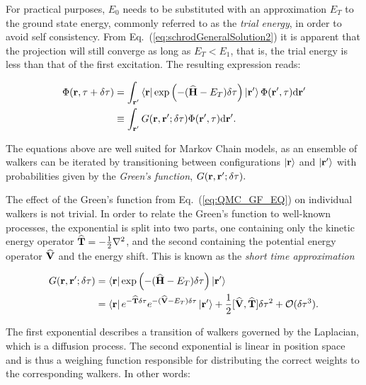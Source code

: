 For practical purposes, $E_0$ needs to be substituted with an approximation $E_T$ to the ground state energy, commonly referred to as the \textit{trial energy}, in order to avoid self consistency. From Eq.~(\ref{eq:schrodGeneralSolution2}) it is apparent that the projection will still converge as long as $E_T < E_1$, that is, the trial energy is less than that of the first excitation. The resulting expression reads:

\begin{align}
 \Phi(\mathbf{r}, \tau + \delta\tau) &= \int_{\mathbf{r}'}\left< \mathbf{r} \right|\exp\left(-({\bf\widehat{H}} - E_T)\delta\tau\right)\left| \mathbf{r}' \right>\Phi(\mathbf{r}', \tau)\mathrm{d}\mathbf{r}' \\
  &\equiv \int_{\mathbf{r}'}G(\mathbf{r}, \mathbf{r'}; \delta\tau)\Phi(\mathbf{r}', \tau)\mathrm{d}\mathbf{r}'.  \label{eq:QMC_GF_EQ}
\end{align}

The equations above are well suited for Markov Chain models, as an ensemble of walkers can be iterated by transitioning between configurations $\left| \mathbf{r} \right>$ and $\left| \mathbf{r}' \right>$ with probabilities given by the \textit{Green's function}, $G(\mathbf{r}, \mathbf{r'}; \delta\tau).$

The effect of the Green's function from Eq.~(\ref{eq:QMC_GF_EQ}) on individual walkers is not trivial. In order to relate the Green's function to well-known processes, the exponential is split into two parts, one containing only the kinetic energy operator ${\bf\widehat{T}} = -\frac{1}{2}\nabla^2$, and the second containing the potential energy operator ${\bf\widehat{V}}$ and the energy shift. This is known as the \textit{short time approximation}\cite{abInitioMC}

\begin{align}
  G(\mathbf{r}, \mathbf{r'}; \delta\tau) &= \left< \mathbf{r} \right|\exp\left(-({\bf\widehat{H}} - E_T)\delta\tau\right)\left| \mathbf{r}' \right> \label{eq:firstTrialEnergyIntro} \\
  &= \left< \mathbf{r} \right|e^{-{\bf\widehat{T}}\delta\tau}e^{-({\bf\widehat{V}} - E_T)\delta\tau}\left| \mathbf{r}' \right> + \frac{1}{2}[{\bf\widehat{V}}, {\bf\widehat{T}}]\delta\tau^2 + \mathcal{O}(\delta\tau^3).  \label{eq:shortTimeApprox}
\end{align}

The first exponential describes a transition of walkers governed by the Laplacian, which is a diffusion process. The second exponential is linear in position space and is thus a weighing function responsible for distributing the correct weights to the corresponding walkers. In other words:

